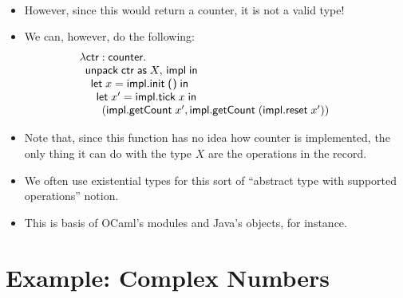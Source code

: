 \documentclass{lecturenotes}
\newcommand{\app}[2]{\ensuremath{#1\;#2}}
\newcommand{\unit}{\ensuremath{\textsf{(}\mkern0.5mu\textsf{)}}}
\begin{document}
\begin{itemize}
$$\begin{array}{l}
\begin{array}{l}
\begin{array}{l}
\begin{array}{l}
\begin{array}{l}
          \end{array}
        \end{array}
      \end{array}
    \end{array}
  \end{array}
  $$
\item However, since this would return a counter, it is not a valid type!
\item We can, however, do the following:
  $$
  \begin{array}{l}
    \lambda \textsf{ctr} \mathrel{:} \textsf{counter}.\\
    \begin{array}{l}
      \textsf{unpack}\mkern5mu\textsf{ctr} \mathrel{\textsf{as}} X,\, \textsf{impl}\;\textsf{in}\\
      \begin{array}{l}
        \textsf{let}\mkern5mux = \app{\textsf{impl}.\textsf{init}}{\unit}\;\textsf{in}\\
        \begin{array}{l}
          \textsf{let}\mkern5mux' = \app{\textsf{impl}.\textsf{tick}}{x}\;\textsf{in}\\
          \begin{array}{l}
            (\app{\textsf{impl}.\textsf{getCount}}{x'}, \app{\textsf{impl}.\textsf{getCount}}{(\app{\textsf{impl}.\textsf{reset}}{x'})})
          \end{array}
        \end{array}
      \end{array}
    \end{array}
  \end{array}
  $$  
\item Note that, since this function has no idea how \textsf{counter} is implemented, the only thing it can do with the type $X$ are the operations in the record.
\item We often use existential types for this sort of ``abstract type with supported operations'' notion.
\item This is basis of OCaml's modules and Java's objects, for instance.
\end{itemize}

\section{Example: Complex Numbers}
\label{sec:compl-numb}
\end{document}
